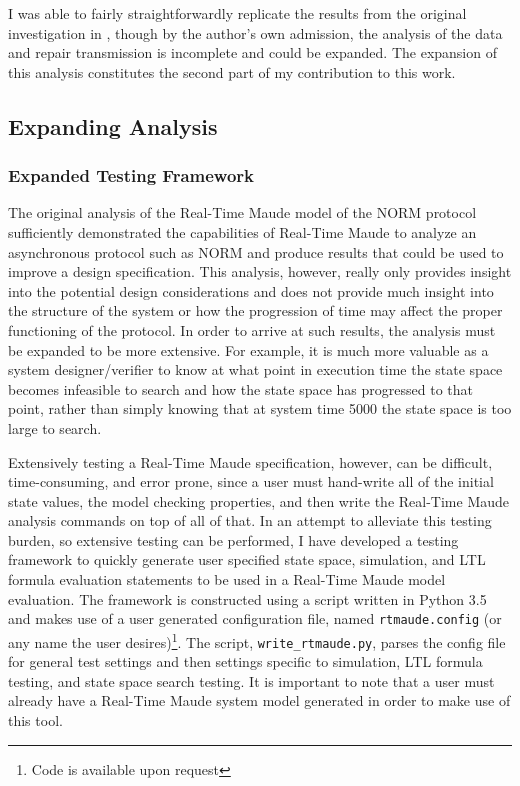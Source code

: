 \documentclass[10pt, journal]{IEEEtran}
\begin{document}
I was able to fairly straightforwardly replicate the results from the original investigation in \cite{Lien2004}, though by the author's own admission, the analysis of the data and repair transmission is incomplete and could be expanded. The expansion of this analysis constitutes the second part of my contribution to this work.

\subsection{Expanding Analysis}

\subsubsection{Expanded Testing Framework}
The original analysis of the Real-Time Maude model of the NORM protocol sufficiently demonstrated the capabilities of Real-Time Maude to analyze an asynchronous protocol such as NORM and produce results that could be used to improve a design specification. This analysis, however, really only provides insight into the potential design considerations and does not provide much insight into the structure of the system or how the progression of time may affect the proper functioning of the protocol. In order to arrive at such results, the analysis must be expanded to be more extensive. For example, it is much more valuable as a system designer/verifier to know at what point in execution time the state space becomes infeasible to search and how the state space has progressed to that point, rather than simply knowing that at system time 5000 the state space is too large to search. 

Extensively testing a Real-Time Maude specification, however, can be difficult, time-consuming, and error prone, since a user must hand-write all of the initial state values, the model checking properties, and then write the Real-Time Maude analysis commands on top of all of that. In an attempt to alleviate this testing burden, so extensive testing can be performed, I have developed a testing framework to quickly generate user specified state space, simulation, and LTL formula evaluation statements to be used in a Real-Time Maude model evaluation. The framework is constructed using a script written in Python 3.5 and makes use of a user generated configuration file, named \texttt{rtmaude.config} (or any name the user desires)\footnote{Code is available upon request}. The script, \texttt{write\_rtmaude.py}, parses the config file for general test settings and then settings specific to simulation, LTL formula testing, and state space search testing. It is important to note that a user must already have a Real-Time Maude system model generated in order to make use of this tool.
\end{document}
